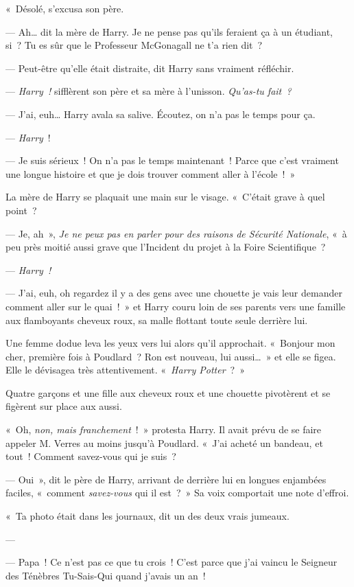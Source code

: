 «~Désolé, s'excusa son père.

--- Ah… dit la mère de Harry. Je ne pense pas qu'ils feraient ça à un étudiant, si~? Tu es sûr que le Professeur McGonagall ne t'a rien dit~?

--- Peut-être qu'elle était distraite, dit Harry sans vraiment réfléchir.

--- \emph{Harry~!} sifflèrent son père et sa mère à l'unisson. \emph{Qu'as-tu fait~?}

--- J'ai, euh… Harry avala sa salive. Écoutez, on n'a pas le temps pour ça.

--- \emph{Harry}~!

--- Je suis sérieux~! On n'a pas le temps maintenant~! Parce que c'est vraiment une longue histoire et que je dois trouver comment aller à l'école~!~»

La mère de Harry se plaquait une main sur le visage.
«~C'était grave à quel point~?

--- Je, ah~», \emph{Je ne peux pas en parler pour des raisons de Sécurité Nationale}, «~à peu près moitié aussi grave que l'Incident du projet à la Foire Scientifique~?

--- \emph{Harry~!}

--- J'ai, euh, oh regardez il y a des gens avec une chouette je vais leur demander comment aller sur le quai~!~» et Harry couru loin de ses parents vers une famille aux flamboyants cheveux roux, sa malle flottant toute seule derrière lui.

Une femme dodue leva les yeux vers lui alors qu'il approchait. «~Bonjour mon cher, première fois à Poudlard~? Ron est nouveau, lui aussi…~» et elle se figea. Elle le dévisagea très attentivement. «~\emph{Harry Potter}~?~»

Quatre garçons et une fille aux cheveux roux et une chouette pivotèrent et se figèrent sur place aux aussi.

«~Oh, \emph{non, mais franchement}~!~» protesta Harry. Il avait prévu de se faire appeler M. Verres au moins jusqu'à Poudlard. «~J'ai acheté un bandeau, et tout~! Comment savez-vous qui je suis~?

--- Oui~», dit le père de Harry, arrivant de derrière lui en longues enjambées faciles, «~comment \emph{savez-vous} qui il est~?~» Sa voix comportait une note d'effroi.

«~Ta photo était dans les journaux, dit un des deux vrais jumeaux.

--- 

--- Papa~! Ce n'est pas ce que tu crois~! C'est parce que j'ai vaincu le Seigneur des Ténèbres Tu-Sais-Qui quand j'avais un an~!

